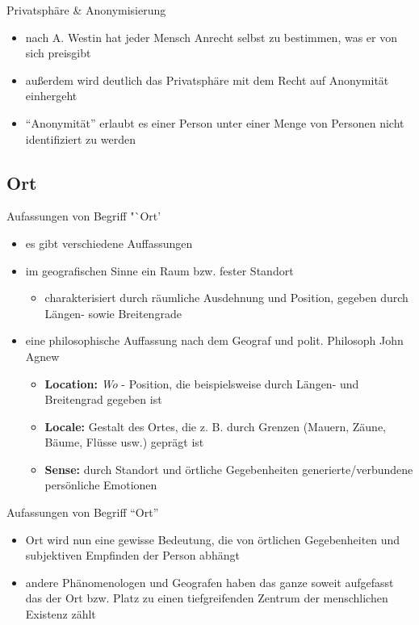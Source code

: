 \begin{frame}{Privatsphäre \& Anonymisierung}
\begin{itemize}
  \item nach A. Westin hat jeder Mensch Anrecht selbst zu bestimmen, was er von sich preisgibt
  \item außerdem wird deutlich das Privatsphäre mit dem Recht auf Anonymität einhergeht
  \item "`Anonymität"' erlaubt es einer Person unter einer Menge von Personen nicht identifiziert zu werden
\end{itemize}
\end{frame}

\subsection*{Ort}
\begin{frame}{Aufassungen von Begriff "`Ort'}
\begin{itemize}
  \item es gibt verschiedene Auffassungen
  \item im geografischen Sinne ein Raum bzw. fester Standort
  \begin{itemize}
    \item charakterisiert durch räumliche Ausdehnung und Position, gegeben durch Längen- sowie Breitengrade
  \end{itemize}
  \item eine philosophische Auffassung nach dem Geograf und polit. Philosoph John Agnew
  \begin{itemize}
    \item \textbf{Location:} \textit{Wo} - Position, die beispielsweise durch Längen- und Breitengrad gegeben ist
    \item \textbf{Locale:} Gestalt des Ortes, die z. B. durch Grenzen (Mauern, Zäune, Bäume, Flüsse usw.) geprägt ist
    \item \textbf{Sense:} durch Standort und örtliche Gegebenheiten generierte/verbundene persönliche Emotionen
  \end{itemize}
\end{itemize}
\end{frame}

\begin{frame}{Aufassungen von Begriff "`Ort"'}
\begin{itemize}
  \item Ort wird nun eine gewisse Bedeutung, die von örtlichen Gegebenheiten und subjektiven Empfinden der Person abhängt
  \item andere Phänomenologen und Geografen haben das ganze soweit aufgefasst das der Ort bzw. Platz zu einen tiefgreifenden Zentrum der menschlichen Existenz zählt
\end{itemize}
\end{frame}

